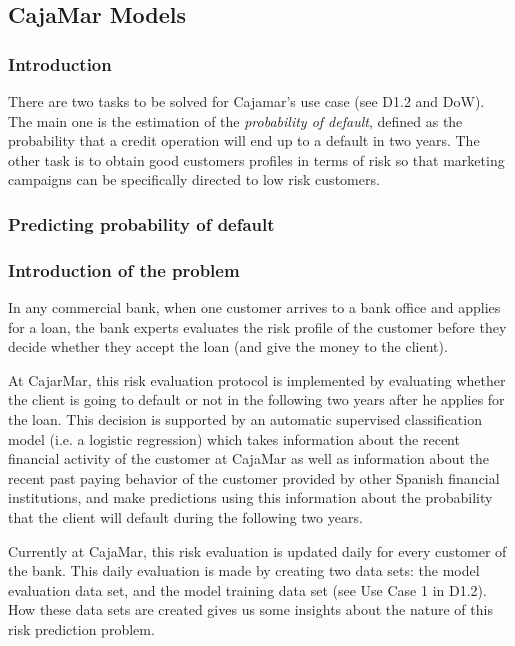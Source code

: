 \subsection{CajaMar Models}
\label{Section:CajaMarModels}

\subsubsection{Introduction}

There are two tasks to be solved for Cajamar's use case (see D1.2 and DoW). The main one is
the estimation of the \emph{probability of default}, defined as the probability that a
credit operation will end up to a default in two years. The other task is to obtain 
good customers profiles in terms of risk so that marketing campaigns can be
specifically directed to low risk customers. 

\subsubsection{Predicting probability of default}

\subsubsection*{Introduction of the problem} 

In any commercial bank, when one customer arrives to a bank office and applies for a loan, the bank experts evaluates the risk profile of the customer before they decide whether they accept the loan (and give the money to the client). 

At CajarMar, this risk evaluation protocol is implemented by evaluating whether the client is going to default or not in the following two years after he applies for the loan. This decision is supported by an automatic supervised classification model (i.e. a logistic regression) which takes information about the recent financial activity of the customer at CajaMar as well as information about the recent past paying behavior of the customer provided by other Spanish financial institutions, and make predictions using this information about the probability that the client will default during the following two years.

Currently at CajaMar, this risk evaluation is updated daily for every customer of the bank. This daily evaluation is made by creating two data sets: the model evaluation data set, and the model training data set (see Use Case 1 in D1.2). How these data sets are created gives us some insights about the nature of this risk prediction problem. 

